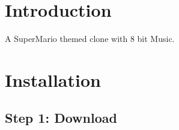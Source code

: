 \hypertarget{index_intro_sec}{}\section{Introduction}\label{index_intro_sec}
A Super\-Mario themed clone with 8 bit Music.\hypertarget{index_install_sec}{}\section{Installation}\label{index_install_sec}
\hypertarget{index_step1}{}\subsection{Step 1\-: Download}\label{index_step1}
